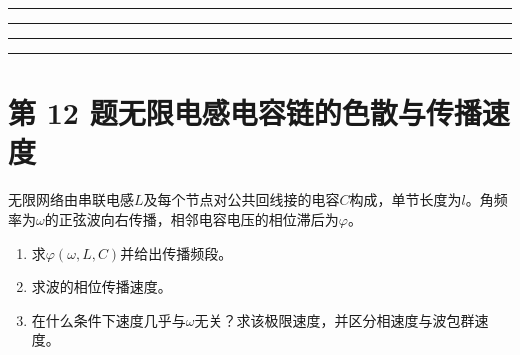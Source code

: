 \documentclass[UTF8,fontset=fandol,a4paper,11pt]{ctexart}
\newcommand{\workarea}{\par\vspace{7mm}\noindent{\small\color{muted}作答区}\par\vspace{4mm}
\noindent\textcolor{rulegray}{\rule{\linewidth}{0.3pt}}\par\vspace{16mm}
\noindent\textcolor{rulegray}{\rule{\linewidth}{0.3pt}}\par\vspace{16mm}
\noindent\textcolor{rulegray}{\rule{\linewidth}{0.3pt}}\par\vspace{16mm}
\noindent\textcolor{rulegray}{\rule{\linewidth}{0.3pt}}}
\begin{document}
\workarea

\clearpage


\section*{第 12 题\quad 无限电感电容链的色散与传播速度}\label{q:12}


无限网络由串联电感$L$及每个节点对公共回线接的电容$C$构成，单节长度为$l$。角频率为$\omega$的正弦波向右传播，相邻电容电压的相位滞后为$\varphi$。
\begin{enumerate}
\item 求$\varphi(\omega,L,C)$并给出传播频段。
\item 求波的相位传播速度。
\item 在什么条件下速度几乎与$\omega$无关？求该极限速度，并区分相速度与波包群速度。
\end{enumerate}
\end{document}
